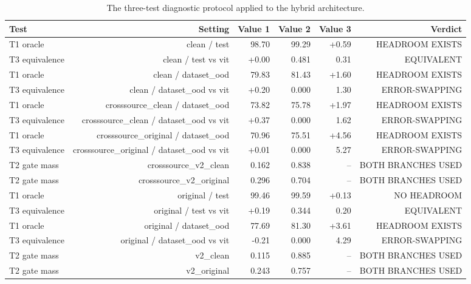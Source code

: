 \begin{table}[t]
\centering
\begin{tabular}{lrrrrr}
\toprule
Test & Setting & Value 1 & Value 2 & Value 3 & Verdict \\
\midrule
T1 oracle & clean / test & 98.70 & 99.29 & +0.59 & HEADROOM EXISTS \\
T3 equivalence & clean / test vs vit & +0.00 & 0.481 & 0.31 & EQUIVALENT \\
T1 oracle & clean / dataset_ood & 79.83 & 81.43 & +1.60 & HEADROOM EXISTS \\
T3 equivalence & clean / dataset_ood vs vit & +0.20 & 0.000 & 1.30 & ERROR-SWAPPING \\
T1 oracle & crosssource_clean / dataset_ood & 73.82 & 75.78 & +1.97 & HEADROOM EXISTS \\
T3 equivalence & crosssource_clean / dataset_ood vs vit & +0.37 & 0.000 & 1.62 & ERROR-SWAPPING \\
T1 oracle & crosssource_original / dataset_ood & 70.96 & 75.51 & +4.56 & HEADROOM EXISTS \\
T3 equivalence & crosssource_original / dataset_ood vs vit & +0.01 & 0.000 & 5.27 & ERROR-SWAPPING \\
T2 gate mass & crosssource_v2_clean & 0.162 & 0.838 & -- & BOTH BRANCHES USED \\
T2 gate mass & crosssource_v2_original & 0.296 & 0.704 & -- & BOTH BRANCHES USED \\
T1 oracle & original / test & 99.46 & 99.59 & +0.13 & NO HEADROOM \\
T3 equivalence & original / test vs vit & +0.19 & 0.344 & 0.20 & EQUIVALENT \\
T1 oracle & original / dataset_ood & 77.69 & 81.30 & +3.61 & HEADROOM EXISTS \\
T3 equivalence & original / dataset_ood vs vit & -0.21 & 0.000 & 4.29 & ERROR-SWAPPING \\
T2 gate mass & v2_clean & 0.115 & 0.885 & -- & BOTH BRANCHES USED \\
T2 gate mass & v2_original & 0.243 & 0.757 & -- & BOTH BRANCHES USED \\
\bottomrule
\end{tabular}
\caption{The three-test diagnostic protocol applied to the hybrid architecture.}
\label{tab:diagnostics}
\end{table}
